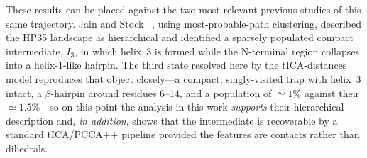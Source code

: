 \documentclass[prl,twocolumn]{revtex4-1}
\begin{document}

These results can be placed against the two most relevant previous
studies of this same trajectory. Jain and
Stock ~\cite{hierarchical_hp35}, using most-probable-path clustering,
described the HP35 landscape as hierarchical and identified a sparsely
populated compact intermediate, $I_3$, in which helix~3 is formed while
the N-terminal region collapses into a helix-1-like hairpin. The third
state resolved here by the tICA-distances model reproduces that object
closely---a compact, singly-visited trap with helix~3 intact, a
$\beta$-hairpin around residues 6--14, and a population of $\simeq 1\%$
against their $\simeq 1.5\%$---so on this point the analysis in this work \emph{supports} their hierarchical description and, \emph{in addition},
shows that the intermediate is recoverable by a standard
tICA/PCCA++ pipeline provided the features are contacts rather than
dihedrals. 
\end{document}
